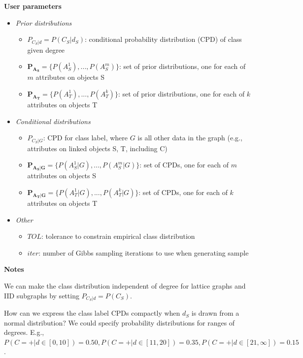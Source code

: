 \documentclass[11pt]{article}
\begin{document}
\small{
\textbf{User parameters}
\vspace{-5.mm}
\begin{itemize}
\item \emph{Prior distributions}
\begin{itemize}
	\item $P_{C_S|d}=P(C_S | d_S)$: conditional probability distribution (CPD) of class given degree
	\item $\mathbf{P_{A_S}}=\{P(A^1_S), ... ,P(A^m_S)\}$: set of prior distributions, one for each of $m$ attributes on objects S
	\item $\mathbf{P_{A_T}}=\{P(A^1_T), ... ,P(A^k_T)\}$: set of prior distributions, one for each of $k$ attributes on objects T
\end{itemize}

\item \emph{Conditional distributions}
\begin{itemize}
	\item $P_{C_S|G}$: CPD for class label, where $G$ is all other data in the graph (e.g., attributes on linked objects S, T, including C)
	\item $\mathbf{P_{A_S|G}}=\{P(A^1_S | G), ... ,P(A^m_S | G)\}$: set of CPDs, one for each of $m$ attributes on objects S
	\item $\mathbf{P_{A_T|G}}=\{P(A^1_T | G), ... ,P(A^k_T | G)\}$: set of CPDs, one for each of $k$ attributes on objects T
\end{itemize}

\item \emph{Other}
\begin{itemize}
	\item $TOL$: tolerance to constrain empirical class distribution 
	\item $iter$: number of Gibbs sampling iterations to use when generating sample
	\end{itemize}
\end{itemize}
}

\vspace{5.mm}
\textbf{Notes}
\vspace{-2.mm}

We can make the class distribution independent of degree for lattice graphs and IID subgraphs by setting $P_{C_S|d}=P(C_S)$.

How can we express the class label CPDs compactly when $d_S$ is drawn from a normal distribution? We could specify probability distributions for ranges of degrees. E.g., $P(C=+|d \in [0,10])=0.50, P(C=+|d \in [11,20])=0.35, P(C=+|d \in [21,\infty])=0.15$.
\end{document}
